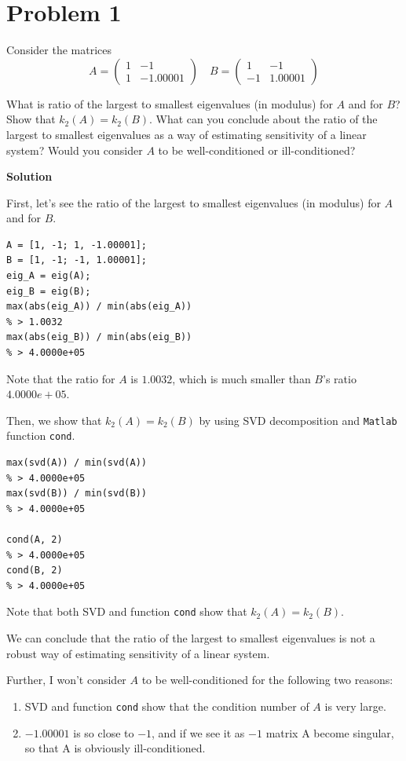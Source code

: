 \documentclass[12pt,oneside,a4paper]{article}
\newcommand{\problem}[1]
{
    \clearpage
    \section*{Problem {#1}}
}
\newcommand{\solution}
{
    \vspace{15pt}
    \noindent\ignorespaces\textbf{\large Solution}\par
}
\newcommand{\m}[1]{\texttt{{#1}}}
\begin{document}
\problem{1}
Consider the matrices $$A = \begin{pmatrix}
  1 & -1 \\
  1 & -1.00001
 \end{pmatrix} \quad B = \begin{pmatrix}
   1 & -1 \\
  -1 & 1.00001
  \end{pmatrix}$$

What is ratio of the largest to smallest eigenvalues (in modulus) for $A$ and for $B$? Show that $k_{2}(A) = k_{2}(B)$. What can you conclude about the ratio of the largest to smallest eigenvalues as a way of estimating sensitivity of a linear system? Would you consider $A$ to be well-conditioned or ill-conditioned?

\solution

First, let's see the ratio of the largest to smallest eigenvalues (in modulus) for $A$ and for $B$.

\begin{lstlisting}
A = [1, -1; 1, -1.00001];
B = [1, -1; -1, 1.00001];
eig_A = eig(A);
eig_B = eig(B);
max(abs(eig_A)) / min(abs(eig_A))
% > 1.0032
max(abs(eig_B)) / min(abs(eig_B))
% > 4.0000e+05
\end{lstlisting}

Note that the ratio for $A$ is $1.0032$, which is much smaller than $B$'s ratio $4.0000e+05$.

Then, we show that $k_{2}(A) = k_{2}(B)$ by using SVD decomposition and \m{Matlab} function \m{cond}.

\begin{lstlisting}
max(svd(A)) / min(svd(A))
% > 4.0000e+05
max(svd(B)) / min(svd(B))
% > 4.0000e+05

cond(A, 2)
% > 4.0000e+05
cond(B, 2)
% > 4.0000e+05
\end{lstlisting}

Note that both SVD and function \m{cond} show that $k_{2}(A) = k_{2}(B)$.

We can conclude that the ratio of the largest to smallest eigenvalues is not a robust way of estimating sensitivity of a linear system. 

Further, I won't consider $A$ to be well-conditioned for the following two reasons: 
\begin{enumerate}
  \item SVD and function \m{cond} show that the condition number of $A$ is very large.
  \item $-1.00001$ is so close to $-1$, and if we see it as $-1$ matrix A become singular, so that A is obviously ill-conditioned.
\end{enumerate}
\end{document}
